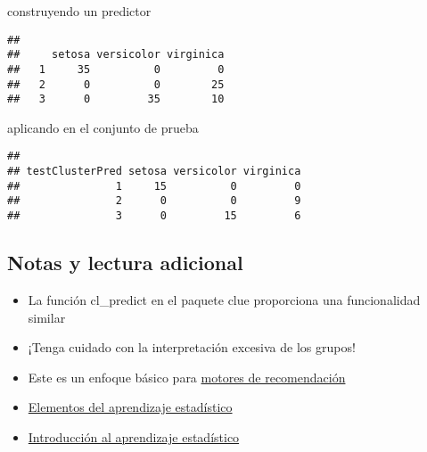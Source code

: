\documentclass[
]{article}
\newenvironment{Shaded}{\begin{snugshade}}{\end{snugshade}}
\newcommand{\AttributeTok}[1]{\textcolor[rgb]{0.77,0.63,0.00}{#1}}
\newcommand{\FunctionTok}[1]{\textcolor[rgb]{0.00,0.00,0.00}{#1}}
\newcommand{\NormalTok}[1]{#1}
\newcommand{\OtherTok}[1]{\textcolor[rgb]{0.56,0.35,0.01}{#1}}
\newcommand{\SpecialCharTok}[1]{\textcolor[rgb]{0.00,0.00,0.00}{#1}}
\newcommand{\StringTok}[1]{\textcolor[rgb]{0.31,0.60,0.02}{#1}}
\providecommand{\tightlist}{%
  \setlength{\itemsep}{0pt}\setlength{\parskip}{0pt}}
\begin{document}
construyendo un predictor

\begin{Shaded}
\end{Shaded}

\begin{verbatim}
##    
##     setosa versicolor virginica
##   1     35          0         0
##   2      0          0        25
##   3      0         35        10
\end{verbatim}

aplicando en el conjunto de prueba

\begin{Shaded}
\end{Shaded}

\begin{verbatim}
##                
## testClusterPred setosa versicolor virginica
##               1     15          0         0
##               2      0          0         9
##               3      0         15         6
\end{verbatim}

\hypertarget{notas-y-lectura-adicional}{%
\subsection{Notas y lectura adicional}\label{notas-y-lectura-adicional}}

\begin{itemize}
\tightlist
\item
  La función cl\_predict en el paquete clue proporciona una
  funcionalidad similar
\item
  ¡Tenga cuidado con la interpretación excesiva de los grupos!
\item
  Este es un enfoque básico para
  \href{http://en.wikipedia.org/wiki/Recommender_system}{motores de
  recomendación}
\item
  \href{http://www-stat.stanford.edu/~tibs/ElemStatLearn/}{Elementos del
  aprendizaje estadístico}
\item
  \href{http://www-bcf.usc.edu/~gareth/ISL/}{Introducción al aprendizaje
  estadístico}
\end{itemize}
\end{document}
